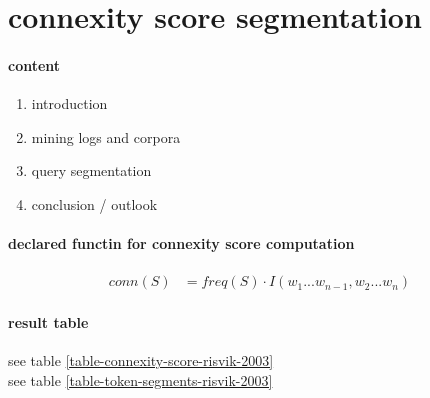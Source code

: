 \section{connexity score segmentation} \label{approach1}

\paragraph{content}
\begin{enumerate}
\item introduction
\item mining logs and corpora
\item query segmentation
\item conclusion / outlook
\end{enumerate}

\paragraph{declared functin for connexity score computation}
\begin{align*}
conn(S) &= freq(S) \cdot I(w_1...w_{n-1},w_2...w_n)
\end{align*}

\paragraph{result table}
see table \ref{table-connexity-score-risvik-2003}\\
see table \ref{table-token-segments-risvik-2003}


